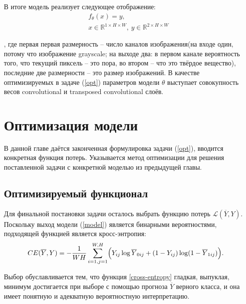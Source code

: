 \documentclass[12pt, a4paper]{extarticle}
\begin{document}
В итоге модель реализует следующее отображение: 
\begin{equation} \label{model}
\begin{aligned}
	& f_{\theta}(x) = y, \\
	& x \in \mathbb{R}^{1 \times H \times W}
		,\ y \in 
		\mathbb{R}^{2 \times H \times W}
\end{aligned}
\end{equation}

, где первая первая размерность -- число каналов изображения(на входе один, потому что изображение grayscale; на выходе два: в первом канале вероятность того, что текущий пиксель -- это пора, во втором -- что это твёрдое вещество), последние две размерности -- это размер изображений. В качестве оптимизируемых в задаче (\ref{opt}) параметров модели $\theta$ выступает совокупность весов convolutional и transposed convolutional слоёв.

\clearpage

\newpage


\section{Оптимизация модели} \label{seg_optimization}

В данной главе даётся законченная формулировка задачи (\ref{opt}), вводится конкретная функция потерь. Указывается метод оптимизации для решения поставленной задачи с конкретной моделью из предыдущей главы.

\subsection{Оптимизируемый функционал}

Для финальной постановки задачи осталось выбрать функцию потерь 
$\mathcal{L}(\overline{Y}, Y)$. Поскольку выход модели (\ref{model})
является бинарными вероятностями, подходящей функцией является кросс-энтропия:
\begin{equation} \label{cross-entropy}
	CE(\overline{Y}, Y) = -\frac{1}{W H} \sum \limits_{i=1, j=1}^{W, H} \Bigl(
		Y_{ij} \log \overline{Y}_{0ij} 
		+ (1 - Y_{ij}) \log (1 - \overline{Y}_{1ij}) \Bigr).
\end{equation}

Выбор обуславливается тем, что функция  \ref{cross-entropy} гладкая, выпуклая, минимум достигается 
при выборе с помощью прогноза $\overline{Y}$ верного класса, и она
имеет понятную и адекватную вероятностную интерпретацию.
\end{document}
